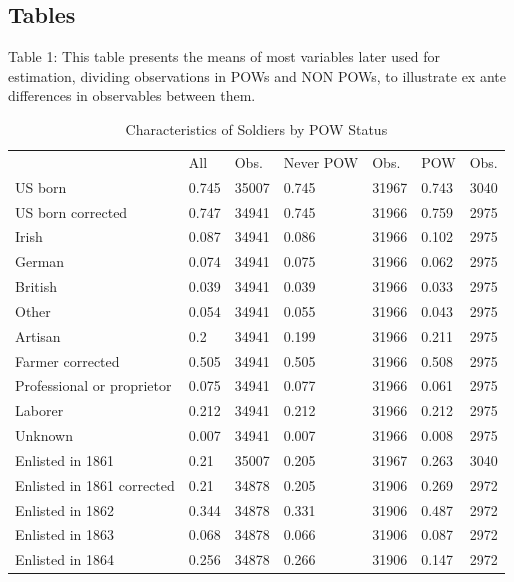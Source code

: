 \documentclass{article}
\begin{document}
\subsection{Tables}
Table 1: This table presents the means of most variables later used for estimation, dividing observations in POWs and NON POWs, to illustrate ex ante differences in observables between them.

\begin{table}[bt]
\centering
\caption{Characteristics of Soldiers by POW Status}
\label{characteristics}
\begin{tabular}{lllllll}
\hline
                           & All   & Obs.  & Never POW & Obs.  & POW   & Obs. \\
US born                    & 0.745 & 35007 & 0.745     & 31967 & 0.743 & 3040 \\
US born corrected          & 0.747 & 34941 & 0.745     & 31966 & 0.759 & 2975 \\
Irish                      & 0.087 & 34941 & 0.086     & 31966 & 0.102 & 2975 \\
German                     & 0.074 & 34941 & 0.075     & 31966 & 0.062 & 2975 \\
British                    & 0.039 & 34941 & 0.039     & 31966 & 0.033 & 2975 \\
Other                      & 0.054 & 34941 & 0.055     & 31966 & 0.043 & 2975 \\
Artisan                    & 0.2   & 34941 & 0.199     & 31966 & 0.211 & 2975 \\
Farmer corrected           & 0.505 & 34941 & 0.505     & 31966 & 0.508 & 2975 \\
Professional or proprietor & 0.075 & 34941 & 0.077     & 31966 & 0.061 & 2975 \\
Laborer                    & 0.212 & 34941 & 0.212     & 31966 & 0.212 & 2975 \\
Unknown                    & 0.007 & 34941 & 0.007     & 31966 & 0.008 & 2975 \\
Enlisted in 1861           & 0.21  & 35007 & 0.205     & 31967 & 0.263 & 3040 \\
Enlisted in 1861 corrected & 0.21  & 34878 & 0.205     & 31906 & 0.269 & 2972 \\
Enlisted in 1862                  & 0.344   & 34878 & 0.331   & 31906 & 0.487  & 2972 \\
Enlisted in 1863                  & 0.068   & 34878 & 0.066   & 31906 & 0.087  & 2972 \\
Enlisted in 1864                  & 0.256   & 34878 & 0.266   & 31906 & 0.147  & 2972 \\

\end{tabular}
\end{table}
\end{document}
